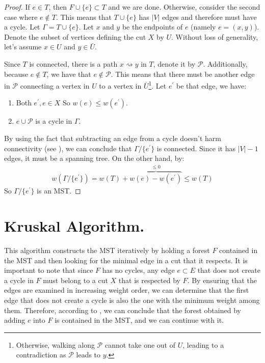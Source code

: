 \begin{proof}
If $e \in T$, then $F \cup \{ e \} \subset T$ and we are done. Otherwise, consider the second case where $e \notin T$. This means that $T \cup \{ e \}$ has $|V|$ edges and therefore must have a cycle. Let $\Gamma = T \cup \{ e \}$. Let $x$ and $y$ be the endpoints of $e$ (namely $e = (x,y)$). Denote the subset of vertices defining the cut $X$ by $U$. Without loss of generality, let's assume $x \in U$ and $y \in \bar{U}$.


Since $T$ is connected, there is a path $x \rightsquigarrow y$ in $T$, denote it by $\mathcal{P}$. Additionally, because $e \notin T$, we have that $e \notin \mathcal{P}$. This means that there must be another edge in $\mathcal{P}$ connecting a vertex in $U$ to a vertex in $\bar{U}$\footnote{Otherwise, walking along $\mathcal{P}$ cannot take one out of $U$, leading to a contradiction as $\mathcal{P}$ leads to $y$.}. Let $e^{\prime}$ be that edge, we have:\begin{enumerate}
    \item Both $e^{\prime}, e \in X$ So $w(e) \le w(e^{\prime})$.
    \item $e \cup \mathcal{P}$ is a cycle in $\Gamma$. 
  \end{enumerate}

By using the fact that subtracting an edge from a cycle doesn't harm connectivity (see ), we can conclude that $\Gamma/\{e^{\prime}\}$ is connected. Since it has $|V|-1$ edges, it must be a spanning tree. On the other hand, by:
  \begin{equation*}
    \begin{split}
      w\left( \Gamma/\{e^{\prime}\} \right) = w\left( T \right) + \overbrace{w(e) - w(e^{\prime})}^{ \le 0} \le w\left( T \right) 
    \end{split}
  \end{equation*}
  So $\Gamma/\{e^{\prime}\}$ is an MST.

\end{proof}
\section{Kruskal Algorithm.} This algorithm constructs the MST iteratively by holding a forest $F$ contained in the MST and then looking for the minimal edge in a cut that it respects. It is important to note that since $F$ has no cycles, any edge $e \subset E$ that does not create a cycle in $F$ must belong to a cut $X$ that is respected by $F$. By ensuring that the edges are examined in increasing weight order, we can determine that the first edge that does not create a cycle is also the one with the minimum weight among them. Therefore, according to , we can conclude that the forest obtained by adding $e$ into $F$ is contained in the MST, and we can continue with it.

